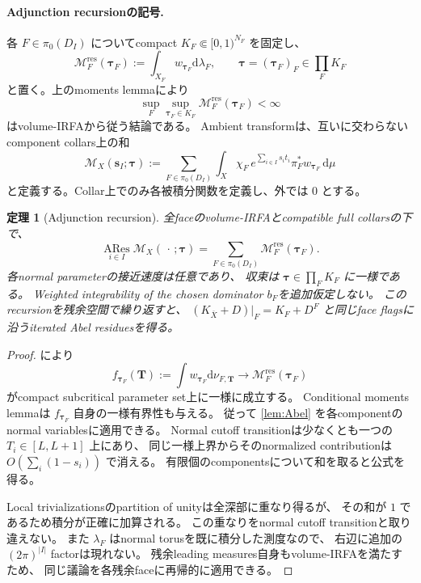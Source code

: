 \documentclass[11pt,a4paper]{ltjsarticle}
\newcommand{\dd}{\mathrm d}
\newcommand{\ARes}{\operatorname*{ARes}}
\newcommand{\ov}{\overline}
\theoremstyle{plain}
\newtheorem{theorem}{定理}[section]
\theoremstyle{definition}
\theoremstyle{remark}
\begin{document}
\paragraph{Adjunction recursionの記号.}
各 $F\in\pi_0(D_I)$ についてcompact $K_F\Subset[0,1)^{N_F}$ を固定し、
\[
 \mathscr M_F^{\mathrm{res}}(\bm\tau_F)
 :=\int_{X_F}w_{\bm\tau_F}\dd\lambda_F,\qquad
 \bm\tau=(\bm\tau_F)_F\in\prod_FK_F
\]
と置く。上のmoments lemmaにより
\begin{equation}
\label{eq:uniform-subcritical-moment}
 \sup_F\sup_{\bm\tau_F\in K_F}
 \mathscr M_F^{\mathrm{res}}(\bm\tau_F)<\infty
\end{equation}
はvolume-IRFAから従う結論である。
Ambient transformは、互いに交わらないcomponent collars上の和
\[
 \mathscr M_X(\bm s_I;\bm\tau)
 :=
 \sum_{F\in\pi_0(D_I)}
 \int_X\chi_F\,e^{\sum_{i\in I}s_it_i}
                    \pi_F^*w_{\bm\tau_F}\,\dd\mu
\]
と定義する。Collar上でのみ各被積分関数を定義し、外では $0$ とする。

\begin{theorem}[Adjunction recursion]
\label{thm:Mellin-recursion}
全faceのvolume-IRFAとcompatible full collarsの下で、
\[
 \boxed{\ARes_{i\in I}\mathscr M_X(\,\cdot\,;\bm\tau)
   =\sum_{F\in\pi_0(D_I)}
      \mathscr M_F^{\mathrm{res}}(\bm\tau_F).}
\]
各normal parameterの接近速度は任意であり、
収束は $\bm\tau\in\prod_FK_F$ に一様である。
Weighted integrability of the chosen dominator $b_F$を追加仮定しない。
このrecursionを残余空間で繰り返すと、
$(K_{\ov X}+D)|_F=K_F+D^F$ と同じface flagsに沿うiterated Abel residuesを得る。
\end{theorem}
\begin{proof}
 により
\[
 f_{\bm\tau_F}(\bm T)
 :=\int w_{\bm\tau_F}\dd\nu_{F,\bm T}
 \longrightarrow\mathscr M_F^{\mathrm{res}}(\bm\tau_F)
\]
がcompact subcritical parameter set上に一様に成立する。
Conditional moments lemmaは $f_{\bm\tau_F}$ 自身の一様有界性も与える。
従って \cref{lem:Abel} を各componentのnormal variablesに適用できる。
Normal cutoff transitionは少なくとも一つの $T_i\in[L,L+1]$ 上にあり、
同じ一様上界からそのnormalized contributionは
$O(\sum_i(1-s_i))$ で消える。
有限個のcomponentsについて和を取ると公式を得る。

Local trivializationsのpartition of unityは全深部に重なり得るが、
その和が $1$ であるため積分が正確に加算される。
この重なりをnormal cutoff transitionと取り違えない。
また $\lambda_F$ はnormal torusを既に積分した測度なので、
右辺に追加の $(2\pi)^{|I|}$ factorは現れない。
残余leading measures自身もvolume-IRFAを満たすため、
同じ議論を各残余faceに再帰的に適用できる。
\end{proof}
\end{document}
